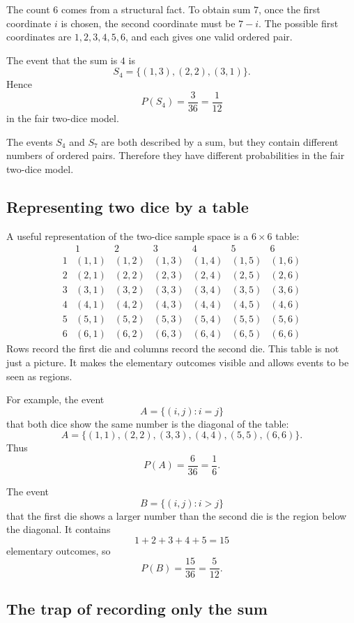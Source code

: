 The count \(6\) comes from a structural fact. To obtain sum \(7\), once the first
coordinate \(i\) is chosen, the second coordinate must be \(7-i\). The possible
first coordinates are \(1,2,3,4,5,6\), and each gives one valid ordered pair.

\begin{examplebox}
The event that the sum is \(4\) is
\[
S_4=\{(1,3),(2,2),(3,1)\}.
\]
Hence
\[
P(S_4)=\frac3{36}=\frac1{12}
\]
in the fair two-dice model.
\end{examplebox}

The events \(S_4\) and \(S_7\) are both described by a sum, but they contain
different numbers of ordered pairs. Therefore they have different probabilities
in the fair two-dice model.

\subsection*{Representing two dice by a table}

A useful representation of the two-dice sample space is a \(6\times 6\) table:
\[
\begin{array}{c|cccccc}
 &1&2&3&4&5&6\\
\hline
1&(1,1)&(1,2)&(1,3)&(1,4)&(1,5)&(1,6)\\
2&(2,1)&(2,2)&(2,3)&(2,4)&(2,5)&(2,6)\\
3&(3,1)&(3,2)&(3,3)&(3,4)&(3,5)&(3,6)\\
4&(4,1)&(4,2)&(4,3)&(4,4)&(4,5)&(4,6)\\
5&(5,1)&(5,2)&(5,3)&(5,4)&(5,5)&(5,6)\\
6&(6,1)&(6,2)&(6,3)&(6,4)&(6,5)&(6,6)
\end{array}
\]
Rows record the first die and columns record the second die. This table is not
just a picture. It makes the elementary outcomes visible and allows events to be
seen as regions.

For example, the event
\[
A=\{(i,j):i=j\}
\]
that both dice show the same number is the diagonal of the table:
\[
A=\{(1,1),(2,2),(3,3),(4,4),(5,5),(6,6)\}.
\]
Thus
\[
P(A)=\frac6{36}=\frac16.
\]

The event
\[
B=\{(i,j):i>j\}
\]
that the first die shows a larger number than the second die is the region below
the diagonal. It contains
\[
1+2+3+4+5=15
\]
elementary outcomes, so
\[
P(B)=\frac{15}{36}=\frac5{12}.
\]

\subsection*{The trap of recording only the sum}

